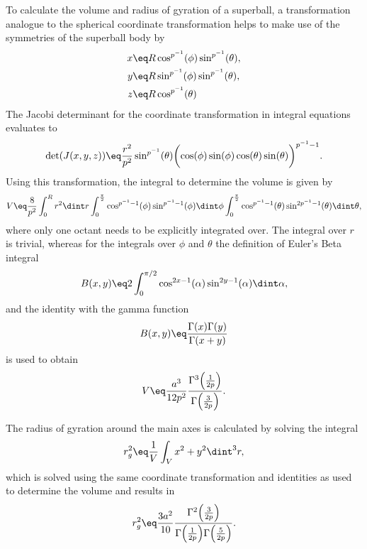 \documentclass[\main/dresen_thesis.tex]{subfiles}
\begin{document}
To calculate the volume and radius of gyration of a superball, a transformation analogue to the spherical coordinate transformation helps to make use of the symmetries of the superball body by
\begin{align}
  x &\eq R \cos^{p^{-1}}(\phi) \sin^{p^{-1}}(\theta),\\
  y &\eq R \sin^{p^{-1}}(\phi) \sin^{p^{-1}}(\theta),\\
  z &\eq R \cos^{p^{-1}}(\theta)
\end{align}
The Jacobi determinant for the coordinate transformation in integral equations evaluates to
\begin{align}
  \det(J(x,y,z)) \eq \frac{r^2}{p^2} \sin^{p^{-1}}(\theta) \biggl(\cos(\phi) \sin(\phi) \cos(\theta) \sin(\theta)\biggr)^{p^{-1}-1}.
\end{align}
Using this transformation, the integral to determine the volume is given by
\begin{align}
  V \eq \frac{8}{p^2}
    \int_{0}^R  r^2 \dint r
    \int_{0}^{\frac{\pi}{2}} \cos^{p^{-1}-1}(\phi) \sin^{p^{-1}-1}(\phi) \dint \phi
    \int_{0}^{\frac{\pi}{2}} \cos^{p^{-1}-1}(\theta) \sin^{2p^{-1}-1}(\theta) \dint \theta,
\end{align}
where only one octant needs to be explicitly integrated over.
The integral over $r$ is trivial, whereas for the integrals over $\phi$ and $\theta$ the definition of Euler's Beta integral \cite{Olver_2010_Handb}
\begin{align}
  B(x, y) \eq 2 \int_0^{\pi/2} \cos^{2x-1}(\alpha) \sin^{2y-1}(\alpha) \dint \alpha,
\end{align}
and the identity with the gamma function
\begin{align}
  B(x, y) \eq \frac{\Gamma(x) \Gamma(y)}{\Gamma(x+y)}
\end{align}
is used to obtain
\begin{align}
  V \eq \frac{a^3}{12 p^2} \frac{\Gamma^3 \Bigl(\frac{1}{2p} \Bigr)}{\Gamma \Bigl(\frac{3}{2p} \Bigr)}.
\end{align}

The radius of gyration around the main axes is calculated by solving the integral
\begin{align}
  r_g^2 \eq \frac{1}{V} \int_V x^2 + y^2 \dint^3 r,
\end{align}
which is solved using the same coordinate transformation and identities as used to determine the volume and results in
\begin{align}
  r_g^2 \eq \frac{3 a^2}{10} \frac{\Gamma^2 \Bigl(\frac{3}{2p} \Bigr)}{\Gamma \Bigl(\frac{1}{2p} \Bigr) \Gamma \Bigl(\frac{5}{2p} \Bigr)}.
\end{align}
\end{document}
